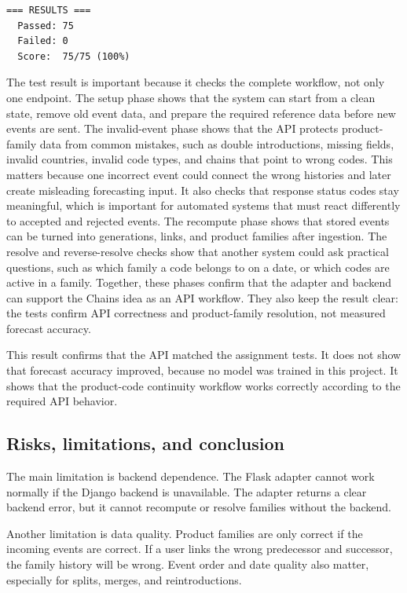 \documentclass[12pt]{article}
\begin{document}
\begin{lstlisting}
=== RESULTS ===
  Passed: 75
  Failed: 0
  Score:  75/75 (100%)
\end{lstlisting}

The test result is important because it checks the complete workflow, not only one endpoint. The setup phase shows that the system can start from a clean state, remove old event data, and prepare the required reference data before new events are sent. The invalid-event phase shows that the API protects product-family data from common mistakes, such as double introductions, missing fields, invalid countries, invalid code types, and chains that point to wrong codes. This matters because one incorrect event could connect the wrong histories and later create misleading forecasting input. It also checks that response status codes stay meaningful, which is important for automated systems that must react differently to accepted and rejected events. The recompute phase shows that stored events can be turned into generations, links, and product families after ingestion. The resolve and reverse-resolve checks show that another system could ask practical questions, such as which family a code belongs to on a date, or which codes are active in a family. Together, these phases confirm that the adapter and backend can support the Chains idea as an API workflow. They also keep the result clear: the tests confirm API correctness and product-family resolution, not measured forecast accuracy.

This result confirms that the API matched the assignment tests. It does not show that forecast accuracy improved, because no model was trained in this project. It shows that the product-code continuity workflow works correctly according to the required API behavior.

\subsection{Risks, limitations, and conclusion}

The main limitation is backend dependence. The Flask adapter cannot work normally if the Django backend is unavailable. The adapter returns a clear backend error, but it cannot recompute or resolve families without the backend.

Another limitation is data quality. Product families are only correct if the incoming events are correct. If a user links the wrong predecessor and successor, the family history will be wrong. Event order and date quality also matter, especially for splits, merges, and reintroductions.
\end{document}
